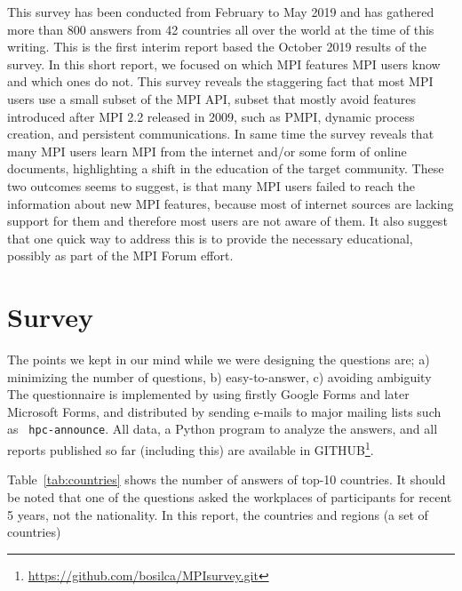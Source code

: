 \documentclass[sigconf,nonacm]{acmart}
\begin{document}
This survey has been conducted from February to May 2019 and has gathered more
than 800 answers from 42 countries all over the world at the time of this
writing.
%
This is the first interim report based the October 2019 results of the survey.
In this short report, we focused on which MPI features MPI users know and which
ones do not.
%
This survey reveals the staggering fact that most MPI users use a small subset
of the MPI API, subset that mostly avoid features introduced after MPI 2.2
released in 2009, such as PMPI, dynamic process creation, and persistent
communications. In same time the survey reveals that many MPI users learn MPI
from the internet and/or some form of online documents, highlighting a shift in
the education of the target community.
%
These two outcomes seems to suggest, is that many MPI users failed to reach the
information about new MPI features, because most of internet sources are lacking
support for them and therefore most users are not aware of them. It also suggest
that one quick way to address this is to provide the necessary educational,
possibly as part of the MPI Forum effort.

\section{Survey}

The points we kept in our mind while we were designing the questions are; a)
minimizing the number of questions, b) easy-to-answer, c) avoiding ambiguity The
questionnaire is implemented by using firstly Google Forms and later Microsoft
Forms, and distributed by sending e-mails to major mailing lists such as {\tt
hpc-announce}. All data, a Python program to analyze the answers, and all
reports published so far (including this) are available in
GITHUB\footnote{\url{https://github.com/bosilca/MPIsurvey.git}}.

Table~\ref{tab:countries} shows the number of answers of top-10
countries. It should be noted that one of the questions asked the
workplaces of participants for recent 5 years, not the nationality.
In this report, the countries and regions (a set of countries)
\vspace{-3mm}
\end{document}
